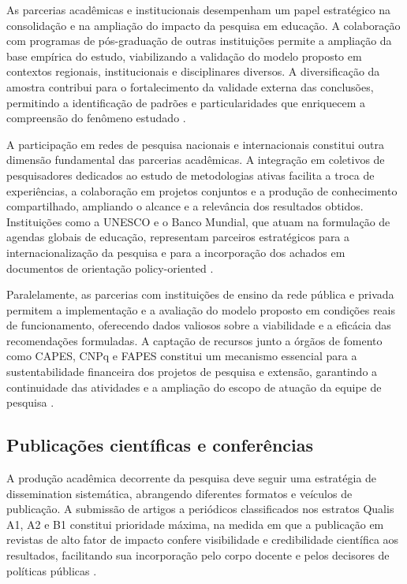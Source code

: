 As parcerias acadêmicas e institucionais desempenham um papel estratégico na consolidação e na ampliação do impacto da pesquisa em educação. A colaboração com programas de pós-graduação de outras instituições permite a ampliação da base empírica do estudo, viabilizando a validação do modelo proposto em contextos regionais, institucionais e disciplinares diversos. A diversificação da amostra contribui para o fortalecimento da validade externa das conclusões, permitindo a identificação de padrões e particularidades que enriquecem a compreensão do fenômeno estudado \cite{LIBANEO2006}.

A participação em redes de pesquisa nacionais e internacionais constitui outra dimensão fundamental das parcerias acadêmicas. A integração em coletivos de pesquisadores dedicados ao estudo de metodologias ativas facilita a troca de experiências, a colaboração em projetos conjuntos e a produção de conhecimento compartilhado, ampliando o alcance e a relevância dos resultados obtidos. Instituições como a UNESCO e o Banco Mundial, que atuam na formulação de agendas globais de educação, representam parceiros estratégicos para a internacionalização da pesquisa e para a incorporação dos achados em documentos de orientação policy-oriented \cite{BENDER2005}.

Paralelamente, as parcerias com instituições de ensino da rede pública e privada permitem a implementação e a avaliação do modelo proposto em condições reais de funcionamento, oferecendo dados valiosos sobre a viabilidade e a eficácia das recomendações formuladas. A captação de recursos junto a órgãos de fomento como CAPES, CNPq e FAPES constitui um mecanismo essencial para a sustentabilidade financeira dos projetos de pesquisa e extensão, garantindo a continuidade das atividades e a ampliação do escopo de atuação da equipe de pesquisa \cite{MUNHOZ2015}.

\subsection{Publicações científicas e conferências}
\label{subsec:publicacoes_conferencias}

A produção acadêmica decorrente da pesquisa deve seguir uma estratégia de dissemination sistemática, abrangendo diferentes formatos e veículos de publicação. A submissão de artigos a periódicos classificados nos estratos Qualis A1, A2 e B1 constitui prioridade máxima, na medida em que a publicação em revistas de alto fator de impacto confere visibilidade e credibilidade científica aos resultados, facilitando sua incorporação pelo corpo docente e pelos decisores de políticas públicas \cite{VEIGA2014}.

